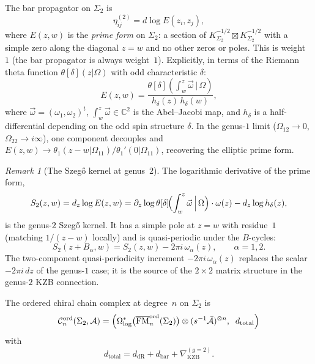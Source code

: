 \documentclass[11pt,reqno]{amsart}
\theoremstyle{definition}
\theoremstyle{remark}
\newtheorem{remark}[theorem]{Remark}
\newcommand{\cA}{\mathcal{A}}
\newcommand{\cC}{\mathcal{C}}
\DeclareMathOperator{\FM}{FM}
\newcommand{\CC}{\mathbb{C}}
\numberwithin{equation}{section}
\begin{document}
The bar propagator on $\Sigma_2$ is
\begin{equation}\label{eq:bar-prop-g2}
  \eta^{(2)}_{ij}
  = d\log E(z_i, z_j),
\end{equation}
where $E(z,w)$ is the \emph{prime form} on $\Sigma_2$:
a section of $K_{\Sigma_2}^{-1/2} \boxtimes
K_{\Sigma_2}^{-1/2}$ with a simple zero along the
diagonal $z = w$ and no other zeros or poles.
This is weight~$1$ (the bar propagator is always weight~$1$).
Explicitly, in terms of the Riemann theta function
$\theta[\delta](z|\Omega)$ with odd characteristic
$\delta$:
\begin{equation}\label{eq:prime-form-g2}
  E(z, w)
  = \frac{\theta[\delta]\!\left(
  \int_w^z \vec{\omega}\,\big|\,\Omega\right)}
  {h_\delta(z)\,h_\delta(w)},
\end{equation}
where $\vec{\omega} = (\omega_1, \omega_2)^t$,
$\int_w^z \vec{\omega} \in \CC^2$ is the Abel--Jacobi
map, and $h_\delta$ is a half-differential depending on the
odd spin structure $\delta$.
In the genus-$1$ limit
($\Omega_{12} \to 0$, $\Omega_{22} \to i\infty$), one
component decouples and
$E(z,w) \to \theta_1(z - w|\Omega_{11})/\theta_1'(0|\Omega_{11})$,
recovering the elliptic prime form.

\begin{remark}[The Szeg\H{o} kernel at genus~$2$]
\label{rem:szego-g2}
The logarithmic derivative of the prime form,
\begin{equation}\label{eq:szego-g2}
  S_2(z, w)
  = d_z \log E(z, w)
  = \partial_z \log \theta[\delta]\!\Bigl(
  \int_w^z \vec{\omega}\,\Big|\,\Omega\Bigr)
  \cdot \omega(z)
  - d_z \log h_\delta(z),
\end{equation}
is the genus-$2$ Szeg\H{o} kernel. It has a simple pole
at $z = w$ with residue~$1$ (matching $1/(z-w)$ locally)
and is quasi-periodic under the $B$-cycles:
\begin{equation}\label{eq:szego-quasiperiod}
  S_2(z + B_\alpha, w)
  = S_2(z, w)
  - 2\pi i\,\omega_\alpha(z),
  \qquad \alpha = 1, 2.
\end{equation}
The two-component quasi-periodicity
increment $-2\pi i\,\omega_\alpha(z)$ replaces the scalar
$-2\pi i\,dz$ of the genus-$1$ case; it is the source of
the $2 \times 2$ matrix structure in the genus-$2$ KZB
connection.
\end{remark}

The ordered chiral chain complex at degree~$n$ on
$\Sigma_2$ is
\begin{equation}\label{eq:g2-chiral-cx}
  \cC_n^{\mathrm{ord}}(\Sigma_2, \cA)
  = \Bigl(
  \Omega^*_{\log}\bigl(
  \overline{\FM}_n^{\mathrm{ord}}(\Sigma_2)\bigr)
  \otimes (s^{-1}\bar{\cA})^{\otimes n},
  \;\; d_{\mathrm{total}}
  \Bigr)
\end{equation}
with
\begin{equation}\label{eq:d-total-g2}
  d_{\mathrm{total}}
  = d_{\mathrm{dR}}
  + d_{\mathrm{bar}}
  + \nabla_{\mathrm{KZB}}^{(g=2)}.
\end{equation}
\end{document}
